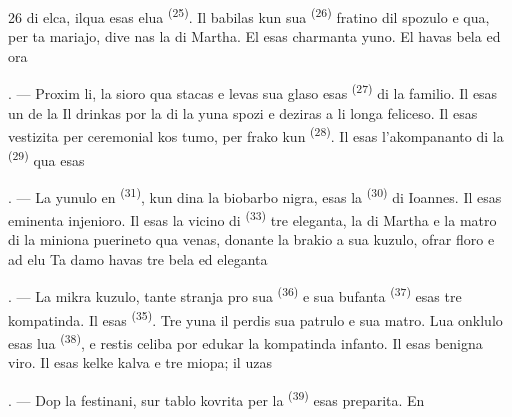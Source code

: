 \begin{VUpage}[28]{26}
\VUcontinue
{} di elca, ilqua esas elua \cc
{} \textsuperscript{(25)}. Il babilas kun sua  \textsuperscript{(26)}\nl
fratino dil spozulo e qua, per ta mariajo, dive\cc
nas la  di Martha. El esas charmanta\nl
yuno. El havas bela  ed\nl
ora 

. --- Proxim li, la sioro qua stacas e levas\nl
sua glaso esas  \textsuperscript{(27)} di la familio. Il esas\nl
un de la  Il  drinkas por\nl
la  di la yuna spozi e deziras a li longa\nl
feliceso. Il esas vestizita per ceremonial kos\cc
tumo, per frako kun  \textsuperscript{(28)}. Il\nl
esas l'akompananto di la  \textsuperscript{(29)} qua esas\nl
{}

. --- La yunulo en  \textsuperscript{(31)}, kun dina la\cc
biobarbo nigra, esas la  \textsuperscript{(30)} di Ioannes.\nl
Il esas eminenta injenioro. Il esas la vicino di\nl
{} \textsuperscript{(33)} tre eleganta, la \nl
di Martha e la matro di la miniona puerineto\nl
qua venas, donante la brakio a sua kuzulo,\nl
ofrar floro e  ad elu  Ta\nl
damo havas tre bela  ed eleganta \cc
{}

. --- La mikra kuzulo, tante stranja pro\nl
sua  \textsuperscript{(36)} e sua bufanta  \textsuperscript{(37)} esas tre\nl
kompatinda. Il esas  \textsuperscript{(35)}. Tre yuna il\nl
perdis sua patrulo e sua matro. Lua onklulo\nl
esas lua  \textsuperscript{(38)}, e restis celiba por edukar\nl
la kompatinda infanto. Il esas benigna viro.\nl
Il esas kelke kalva e tre miopa; il uzas \cc
{}

\VUsaut{2.4mm}
\VUsaut{3.0mm}

. --- Dop la festinani, sur tablo kovrita per\nl
{} la  \textsuperscript{(39)} esas preparita. En
\parplein
\end{VUpage}

